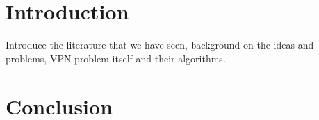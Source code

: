 \documentclass[11pt]{article}
\theoremstyle{definition}
\begin{document}
    \section{Introduction}
    Introduce the literature that we have seen, background on the ideas and problems, VPN problem itself and their algorithms.

    

    

    \section{Conclusion}
\end{document}
